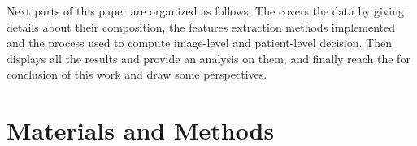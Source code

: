 \documentclass[journal,article,submit,moreauthors,pdftex, applsci]{Definitions/mdpi}
\begin{document}
Next parts of this paper are organized as follows. The  covers the data by giving details about their composition, the features extraction methods implemented and the process used to compute image-level and patient-level decision. Then  displays all the results and provide an analysis on them, and finally reach the  for conclusion of this work and draw some perspectives.\par
 
\section{Materials and Methods}
\label{sec:material}

\end{document}
